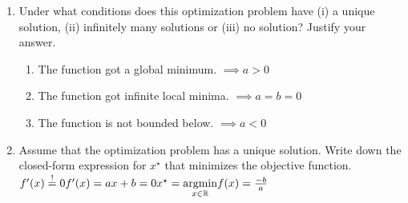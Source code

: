 %

\begin{enumerate}[label=(\alph*)]
	\item Under what conditions does this optimization problem have (i) a unique solution, (ii) infinitely many solutions or (iii) no solution? Justify your answer.
	\begin{enumerate}[label=(\roman*)]
		\item The function got a global minimum. $\implies a > 0$ 
		\item The function got infinite local minima. $\implies a = b = 0$
		\item The function is not bounded below. $\implies a < 0$
	\end{enumerate}

	\item Assume that the optimization problem has a unique solution. Write down the closed-form expression for $x^\star$ that minimizes the objective function.
		\subitem $f^{\prime}(x)\stackrel{!}{=}0 \\ f^{\prime}(x) = ax + b = 0 \\ x^\star = \underset{x\in \mathbb{R}}{\operatorname{argmin}}f(x)= \frac{-b}{a}  $
\end{enumerate}
%
%
